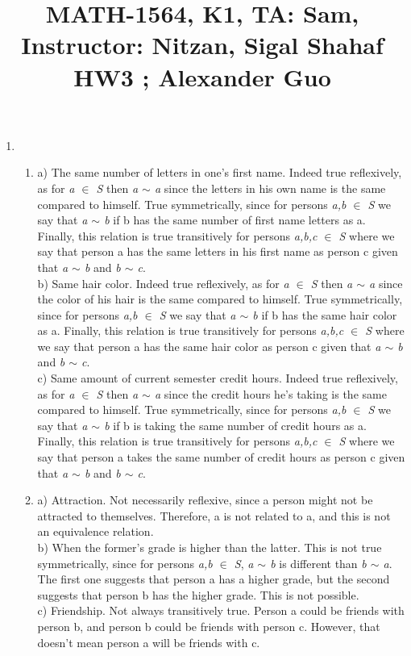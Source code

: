 \documentclass{article}
\title{\large{\vspace{-1.0cm}MATH-1564, K1, TA: Sam, Instructor: Nitzan, Sigal Shahaf \\ HW3 ; Alexander Guo}}
\date{}
\begin{document}
\maketitle

\vspace{-1.5cm}
\large
\begin{enumerate}

	\item

	\begin{enumerate}[label=(\roman*)]

	\item 

a) The same number of letters in one's first name. Indeed true reflexively, as for \textit{a $\in$ S} then \textit{a $\sim$ a} since the letters in his own name is the same compared to himself. True symmetrically, since for persons \textit{a,b $\in$ S} we say that \textit{a $\sim$ b} if b has the same number of first name letters as a. Finally, this relation is true transitively for persons \textit{a,b,c $\in$ S} where we say that person a has the same letters in his first name as person c given that \textit{a $\sim$ b} and \textit{b $\sim$ c}. \\
b) Same hair color. Indeed true reflexively, as for \textit{a $\in$ S} then \textit{a $\sim$ a} since the color of his hair is the same compared to himself. True symmetrically, since for persons \textit{a,b $\in$ S} we say that \textit{a $\sim$ b} if b has the same hair color as a. Finally, this relation is true transitively for persons \textit{a,b,c $\in$ S} where we say that person a has the same hair color as person c given that \textit{a $\sim$ b} and \textit{b $\sim$ c}. \\
c) Same amount of current semester credit hours. Indeed true reflexively, as for \textit{a $\in$ S} then \textit{a $\sim$ a} since the credit hours he's taking is the same compared to himself. True symmetrically, since for persons \textit{a,b $\in$ S} we say that \textit{a $\sim$ b} if b is taking the same number of credit hours as a. Finally, this relation is true transitively for persons \textit{a,b,c $\in$ S} where we say that person a takes the same number of credit hours as person c given that \textit{a $\sim$ b} and \textit{b $\sim$ c}.
	 
	\item

a) Attraction. Not necessarily reflexive, since a person might not be attracted to themselves. Therefore, a is not related to a, and this is not an equivalence relation. \\
b) When the former's grade is higher than the latter. This is not true symmetrically, since for persons \textit{a,b $\in$ S}, \textit{a $\sim$ b} is different than \textit{b $\sim$ a}. The first one suggests that person a has a higher grade, but the second suggests that person b has the higher grade. This is not possible.\\
c) Friendship. Not always transitively true. Person a could be friends with person b, and person b could be friends with person c. However, that doesn't mean person a will be friends with c.
	

\end{enumerate}
\end{enumerate}
\end{document}
